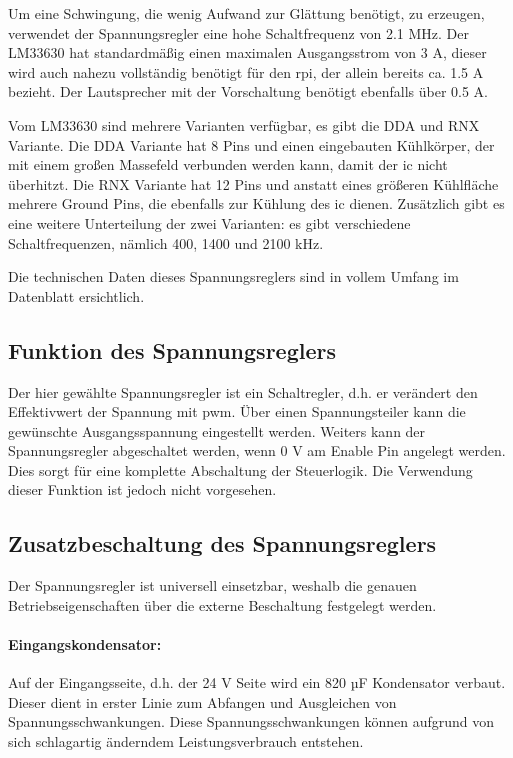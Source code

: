 Um eine Schwingung, die wenig Aufwand zur Glättung benötigt, zu erzeugen, verwendet der Spannungsregler eine hohe Schaltfrequenz von 2.1 MHz.
Der LM33630 hat standardmäßig einen maximalen Ausgangsstrom von 3 A, dieser wird auch nahezu vollständig benötigt für den \ac{rpi}, der allein bereits ca. 1.5 A bezieht.
Der Lautsprecher mit der Vorschaltung benötigt ebenfalls über 0.5 A.\par

Vom LM33630 sind mehrere Varianten verfügbar, es gibt die DDA und RNX Variante.
Die DDA Variante hat 8 Pins und einen eingebauten Kühlkörper, der mit einem großen Massefeld verbunden werden kann, damit der \ac{ic} nicht überhitzt.
Die RNX Variante hat 12 Pins und anstatt eines größeren Kühlfläche mehrere Ground Pins, die ebenfalls zur Kühlung des \ac{ic} dienen.
Zusätzlich gibt es eine weitere Unterteilung der zwei Varianten: es gibt verschiedene Schaltfrequenzen, nämlich 400, 1400 und 2100 kHz.\par
Die technischen Daten dieses Spannungsreglers sind in vollem Umfang im Datenblatt ersichtlich. \cite[vgl.][]{lmr33630-datasheet}

\subsection{Funktion des Spannungsreglers}
Der hier gewählte Spannungsregler ist ein Schaltregler, d.h. er verändert den Effektivwert der Spannung mit \ac{pwm}.
Über einen Spannungsteiler kann die gewünschte Ausgangsspannung eingestellt werden.
Weiters kann der Spannungsregler abgeschaltet werden, wenn 0 V am Enable Pin angelegt werden.
Dies sorgt für eine komplette Abschaltung der Steuerlogik.
Die Verwendung dieser Funktion ist jedoch nicht vorgesehen.

\subsection{Zusatzbeschaltung des Spannungsreglers}
Der Spannungsregler ist universell einsetzbar, weshalb die genauen Betriebseigenschaften über die externe Beschaltung festgelegt werden.
\paragraph{Eingangskondensator:}
Auf der Eingangsseite, d.h. der 24 V Seite wird ein 820 µF Kondensator verbaut.
Dieser dient in erster Linie zum Abfangen und Ausgleichen von Spannungsschwankungen.
Diese Spannungsschwankungen können aufgrund von sich schlagartig änderndem Leistungsverbrauch entstehen.

